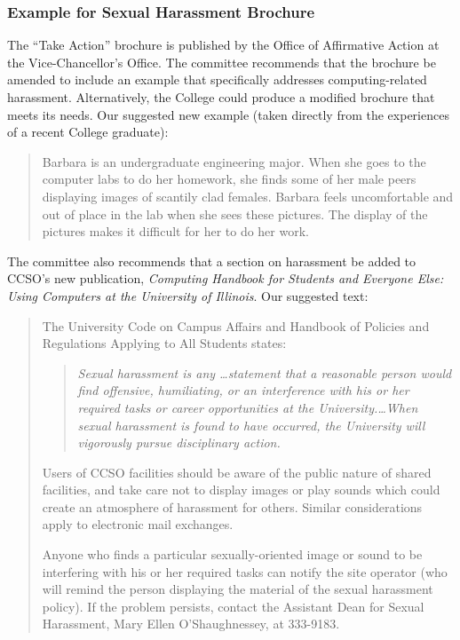 \newpage
\subsubsection{Example for Sexual Harassment Brochure}

The ``Take Action'' brochure is published by 
the Office of Affirmative Action at the Vice-Chancellor's Office.
The committee  recommends that the brochure 
be amended to include an example that
specifically addresses computing-related harassment.  
Alternatively, the College could produce a modified brochure that
meets its needs.
Our
suggested new example (taken directly from the experiences
of a recent College graduate):

\begin{quote}
Barbara is an undergraduate engineering major.  When she goes to 
the computer labs to do her homework, she finds some of her male peers 
displaying images of scantily clad females.  Barbara feels uncomfortable 
and out of place in the lab when she sees these pictures.  The display
of the pictures makes it difficult for her to do her work.
\end{quote}

The committee also recommends that a section on harassment
be added to CCSO's new publication,
{\em Computing Handbook
for Students and Everyone Else: Using Computers at
the University of Illinois}.
Our suggested text:

\begin{quote}
 The University Code on Campus Affairs and Handbook of
Policies and Regulations Applying to All Students states:


\begin{quotation}
\noindent
{\em Sexual harassment is any \ldots statement that a reasonable 
person would find offensive, humiliating, or an interference with his 
or her required tasks or career opportunities at the 
University.\ldots When sexual harassment is found to have occurred, the
University will vigorously pursue disciplinary action. }
\end{quotation}

Users of CCSO facilities should be aware of the 
public nature of shared facilities, and take care not to display
images or play sounds which could create an atmosphere of
harassment for others.  Similar considerations apply to electronic
mail exchanges.

Anyone who finds a particular sexually-oriented image 
or sound to be interfering with his or her required tasks 
can notify the site operator
(who will remind the person displaying the material of the sexual
harassment policy).
If the problem
persists, contact the Assistant Dean for Sexual Harassment, Mary Ellen
O'Shaughnessey, at 333-9183.


\end{quote}

